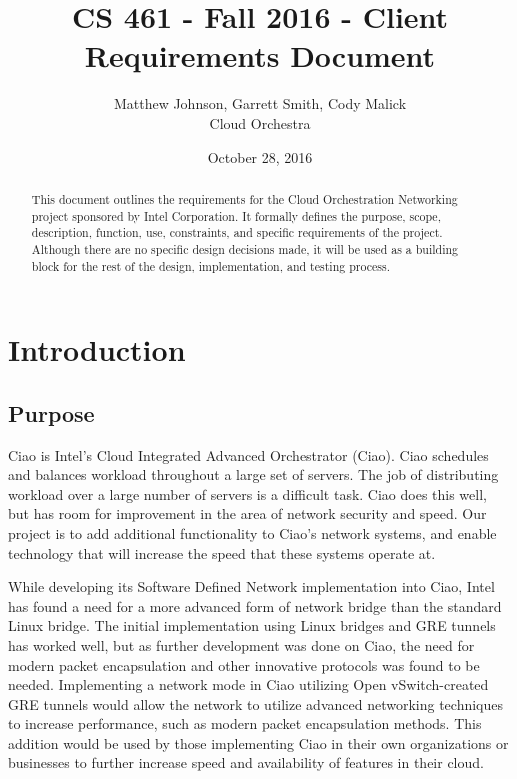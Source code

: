 \documentclass[10pt,letterpaper,onecolumn,draftclsnofoot]{IEEEtran}
\begin{document}
\begin{titlepage}
	\title{CS 461 - Fall 2016 - Client Requirements Document}
	\author{Matthew Johnson, Garrett Smith, Cody Malick\\Cloud Orchestra}
	\date{October 28, 2016}
	\maketitle
	\vspace{4cm}
	\begin{abstract}
		\noindent This document outlines the requirements for the Cloud Orchestration
		Networking project sponsored by Intel Corporation. It formally defines the
		purpose, scope, description, function, use, constraints, and specific
		requirements of the project. Although there are no specific design decisions
		made, it will be used as a building block for the rest of the design,
		implementation, and testing process.

	\end{abstract}

\end{titlepage}
\tableofcontents
\clearpage

\section{Introduction}

\subsection{Purpose}

Ciao is Intel's Cloud Integrated Advanced Orchestrator (Ciao). Ciao schedules and balances workload
throughout a large set of servers. The job of distributing workload over a large number of servers is a difficult
task. Ciao does this well, but has room for improvement in the area of network security and speed. Our
project is to add additional functionality to Ciao's network systems, and enable technology that will
increase the speed that these systems operate at.


While developing its Software Defined Network implementation into Ciao, Intel has found a need for a
more advanced form of network bridge than the standard Linux bridge.
The initial implementation using Linux bridges and GRE tunnels has worked well, but as further
development was done on Ciao, the need for modern packet encapsulation and other innovative protocols
was found to be needed. Implementing a network mode in Ciao utilizing Open vSwitch-created GRE
tunnels would allow the network to utilize advanced networking techniques to increase performance,
such as modern packet encapsulation methods. This addition would be used by those implementing Ciao in
their own organizations or businesses to further increase speed and availability of features in
their cloud.
\end{document}
